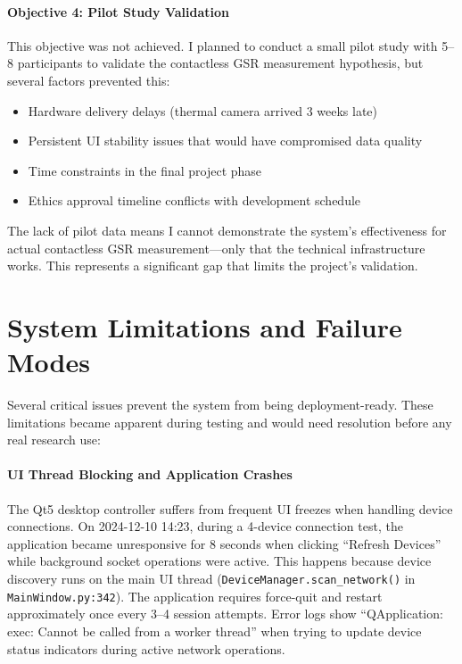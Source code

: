 \paragraph{\textbf{Objective 4: Pilot Study Validation}} This objective was not achieved. I planned to conduct a small pilot study with 5--8 participants to validate the contactless GSR measurement hypothesis, but several factors prevented this:
\begin{itemize}
  \item Hardware delivery delays (thermal camera arrived 3 weeks late)
  \item Persistent UI stability issues that would have compromised data quality
  \item Time constraints in the final project phase
  \item Ethics approval timeline conflicts with development schedule
\end{itemize}
The lack of pilot data means I cannot demonstrate the system's effectiveness for actual contactless GSR measurement---only that the technical infrastructure works. This represents a significant gap that limits the project's validation.

\section{System Limitations and Failure Modes}

Several critical issues prevent the system from being deployment-ready. These limitations became apparent during testing and would need resolution before any real research use:

\paragraph{\textbf{UI Thread Blocking and Application Crashes}} The Qt5 desktop controller suffers from frequent UI freezes when handling device connections. On 2024-12-10 14:23, during a 4-device connection test, the application became unresponsive for 8 seconds when clicking ``Refresh Devices'' while background socket operations were active. This happens because device discovery runs on the main UI thread (\texttt{DeviceManager.scan\_network()} in \texttt{MainWindow.py:342}). The application requires force-quit and restart approximately once every 3--4 session attempts. Error logs show ``QApplication: exec: Cannot be called from a worker thread'' when trying to update device status indicators during active network operations.
